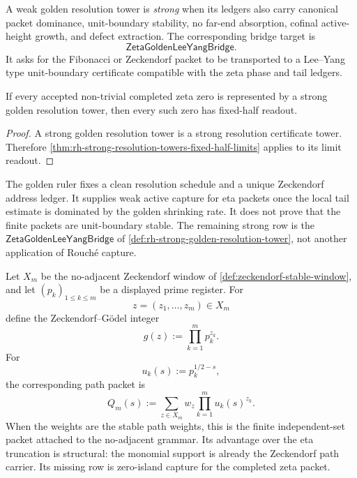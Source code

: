 \begin{definition}
\label{def:rh-strong-golden-resolution-tower}
A weak golden resolution tower is \emph{strong} when its ledgers also
carry canonical packet dominance, unit-boundary stability, no far-end
absorption, cofinal active-height growth, and defect extraction. The
corresponding bridge target is
$$
\mathsf{ZetaGoldenLeeYangBridge}.
$$
It asks for the Fibonacci or Zeckendorf packet to be transported to a
Lee--Yang type unit-boundary certificate compatible with the zeta phase
and tail ledgers.
\end{definition}

\begin{corollary}
\label{cor:rh-strong-golden-coverage-conditionally-sufficient}
If every accepted non-trivial completed zeta zero is represented by a
strong golden resolution tower, then every such zero has fixed-half
readout.
\end{corollary}

\begin{proof}
A strong golden resolution tower is a strong resolution certificate
tower. Therefore
\autoref{thm:rh-strong-resolution-towers-fixed-half-limits} applies to
its limit readout.
\end{proof}

\begin{principle}
\label{prin:rh-golden-rulers-not-boundary-stability}
The golden ruler fixes a clean resolution schedule and a unique
Zeckendorf address ledger. It supplies weak active capture for eta
packets once the local tail estimate is dominated by the golden
shrinking rate. It does not prove that the finite packets are
unit-boundary stable. The remaining strong row is the
$\mathsf{ZetaGoldenLeeYangBridge}$ of
\autoref{def:rh-strong-golden-resolution-tower}, not another
application of Rouch\'e capture.
\end{principle}

\begin{definition}
\label{def:rh-zeckendorf-godel-path-packet}
Let $X_m$ be the no-adjacent Zeckendorf window of
\autoref{def:zeckendorf-stable-window}, and let $(p_k)_{1\le k\le m}$ be
a displayed prime register. For
$$
z=(z_1,\ldots,z_m)\in X_m
$$
define the Zeckendorf--G\"odel integer
$$
g(z):=\prod_{k=1}^{m}p_k^{z_k}.
$$
For
$$
u_k(s):=p_k^{1/2-s},
$$
the corresponding path packet is
$$
Q_m(s):=
\sum_{z\in X_m}w_z\prod_{k=1}^{m}u_k(s)^{z_k}.
$$
When the weights are the stable path weights, this is the finite
independent-set packet attached to the no-adjacent grammar. Its
advantage over the eta truncation is structural: the monomial support is
already the Zeckendorf path carrier. Its missing row is zero-island
capture for the completed zeta packet.
\end{definition}

